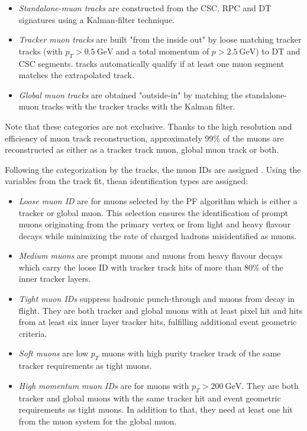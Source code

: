 \begin{itemize}
	\item[] \textit{Standalone-muon tracks} are constructed from the CSC, RPC and DT signatures using a Kalman-filter technique.
	\item[] \textit{Tracker muon tracks} are built "from the inside out" by loose matching tracker tracks (with $p_T > \SI{0.5}{\giga\electronvolt}$ and a total momentum of $p>\SI{2.5}{\giga\electronvolt}$) to DT and CSC segments. tracks automatically qualify if at least one muon segment matches the extrapolated track.
	\item[] \textit{Global muon tracks} are obtained "outside-in" by matching the standalone-muon tracks with the tracker tracks with the Kalman filter.
\end{itemize}

Note that these categories are not exclusive. Thanks to the high resolution and efficiency of muon track reconstruction, approximately 99\% of the muons are reconstructed as either as a tracker track muon, global muon track or both.

Following the categorization by the tracks, the muon IDs are assigned \cite{Sirunyan_2018_muons}. Using the variables from the track fit, thean identification types are assigned:

\begin{itemize}
	\item[] \textit{Loose muon ID} are for muons selected by the PF algorithm which is either a tracker or global muon. This selection ensures the identification of prompt muons originating from the primary vertex or from light and heavy flavour decays while minimizing the rate of charged hadrons misidentified as muons.
	\item[] \textit{Medium muons} are prompt muons and muons from heavy flavour decays which carry the loose ID with tracker track hits of more than 80\% of the inner tracker layers.
	\item[] \textit{Tight muon IDs} suppress hadronic punch-through and muons from decay in flight. They are both tracker and global muons with at least pixel hit and hits from at least six inner layer tracker hits, fulfilling additional event geometric criteria.
	\item[] \textit{Soft muons} are low $p_T$ muons with high purity tracker track of the same tracker requirements as tight muons.
	\item[] \textit{High momentum muon IDs} are for muons with $p_T > \SI{200}{\giga\electronvolt}$. They are both tracker and global muons with the same tracker hit and event geometric requirements as tight muons. In addition to that, they need at least one hit from the muon system for the global muon.
\end{itemize}